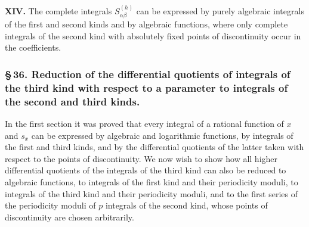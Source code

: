 \documentclass[10pt]{article}
\begin{document}
\noindent\textbf{XIV.} The complete integrals \(S_{\alpha\beta}^{(h)}\) can be expressed by purely algebraic integrals of the first and second kinds and by algebraic functions, where only complete integrals of the second kind with absolutely fixed points of discontinuity occur in the coefficients.

\subsubsection*{\S\,36. Reduction of the differential quotients of integrals of the third kind with respect to a parameter to integrals of the second and third kinds.}

In the first section it was proved that every integral of a rational function of \(x\) and \(s_x\) can be expressed by algebraic and logarithmic functions, by integrals of the first and third kinds, and by the differential quotients of the latter taken with respect to the points of discontinuity. We now wish to show how all higher differential quotients of the integrals of the third kind can also be reduced to algebraic functions, to integrals of the first kind and their periodicity moduli, to integrals of the third kind and their periodicity moduli, and to the first series of the periodicity moduli of \(p\) integrals of the second kind, whose points of discontinuity are chosen arbitrarily.
\end{document}
